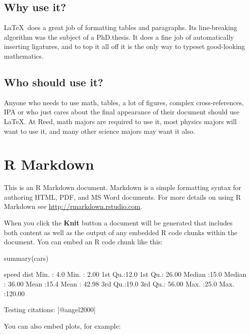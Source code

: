 \documentclass[12pt,twoside]{reedthesis}
\begin{document}
  \section{Why use it?}

  \LaTeX~does a great job of formatting tables and paragraphs. Its
  line-breaking algorithm was the subject of a PhD.\thinspace thesis. It
  does a fine job of automatically inserting ligatures, and to top it all
  off it is the only way to typeset good-looking mathematics.

  \section{Who should use it?}

  Anyone who needs to use math, tables, a lot of figures, complex
  cross-references, IPA or who just cares about the final appearance of
  their document should use \LaTeX. At Reed, math majors are required to
  use it, most physics majors will want to use it, and many other science
  majors may want it also.

  \chapter{R Markdown}

  This is an R Markdown document. Markdown is a simple formatting syntax
  for authoring HTML, PDF, and MS Word documents. For more details on
  using R Markdown see \url{http://rmarkdown.rstudio.com}.

  When you click the \textbf{Knit} button a document will be generated
  that includes both content as well as the output of any embedded R code
  chunks within the document. You can embed an R code chunk like this:

  \begin{CodeChunk}
  \begin{CodeInput}
  summary(cars)
  \end{CodeInput}
  \begin{CodeOutput}
       speed           dist
   Min.   : 4.0   Min.   :  2.00
   1st Qu.:12.0   1st Qu.: 26.00
   Median :15.0   Median : 36.00
   Mean   :15.4   Mean   : 42.98
   3rd Qu.:19.0   3rd Qu.: 56.00
   Max.   :25.0   Max.   :120.00
  \end{CodeOutput}
  \end{CodeChunk}

  Testing citations: \cite{angel2000} {[}@angel2000{]}

  You can also embed plots, for example:
\end{document}
